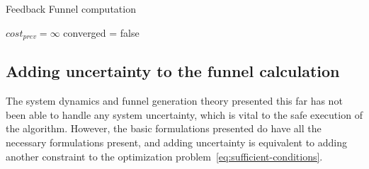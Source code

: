 \begin{algorithm}
  \caption{Feedback Funnel computation}
  \label{alg:funnelalgorithm-extended}
  \DontPrintSemicolon \SetAlgoNoLine

   

  \(cost_{prev} = \infty\)\; converged = false \; \;
\end{algorithm}


\subsection{Adding uncertainty to the funnel calculation}
\label{sec:adding-uncertainty}

The system dynamics and funnel generation theory presented this far has not been
able to handle any system uncertainty, which is vital to the safe execution of
the \rrtfunnel{} algorithm. However, the basic formulations presented do have
all the necessary formulations present, and adding uncertainty is equivalent to
adding another constraint to the optimization
problem~\cref{eq:sufficient-conditions}.

